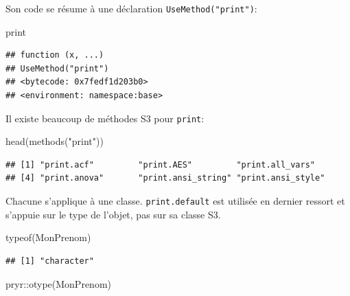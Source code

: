 \documentclass[
  11pt,
  french,
  a4paper,
  extrafontsizes,onecolumn,openright
  ]{memoir}
\newenvironment{Shaded}{\begin{snugshade}}{\end{snugshade}}
\newcommand{\FunctionTok}[1]{\textcolor[rgb]{0.00,0.00,0.00}{#1}}
\newcommand{\NormalTok}[1]{#1}
\newcommand{\SpecialCharTok}[1]{\textcolor[rgb]{0.00,0.00,0.00}{#1}}
\newcommand{\StringTok}[1]{\textcolor[rgb]{0.31,0.60,0.02}{#1}}
\begin{document}
\normalsize

Son code se résume à une déclaration \texttt{UseMethod("print")}:

\scriptsize

\begin{Shaded}
\begin{Highlighting}[]
\NormalTok{print}
\end{Highlighting}
\end{Shaded}

\begin{verbatim}
## function (x, ...) 
## UseMethod("print")
## <bytecode: 0x7fedf1d203b0>
## <environment: namespace:base>
\end{verbatim}

\normalsize

Il existe beaucoup de méthodes S3 pour \texttt{print}:

\scriptsize

\begin{Shaded}
\begin{Highlighting}[]
\FunctionTok{head}\NormalTok{(}\FunctionTok{methods}\NormalTok{(}\StringTok{"print"}\NormalTok{))}
\end{Highlighting}
\end{Shaded}

\begin{verbatim}
## [1] "print.acf"         "print.AES"         "print.all_vars"   
## [4] "print.anova"       "print.ansi_string" "print.ansi_style"
\end{verbatim}

\normalsize

Chacune s'applique à une classe. \texttt{print.default} est utilisée en dernier ressort et s'appuie sur le type de l'objet, pas sur sa classe S3.

\scriptsize

\begin{Shaded}
\begin{Highlighting}[]
\FunctionTok{typeof}\NormalTok{(MonPrenom)}
\end{Highlighting}
\end{Shaded}

\begin{verbatim}
## [1] "character"
\end{verbatim}

\begin{Shaded}
\begin{Highlighting}[]
\NormalTok{pryr}\SpecialCharTok{::}\FunctionTok{otype}\NormalTok{(MonPrenom)}
\end{Highlighting}
\end{Shaded}
\end{document}
